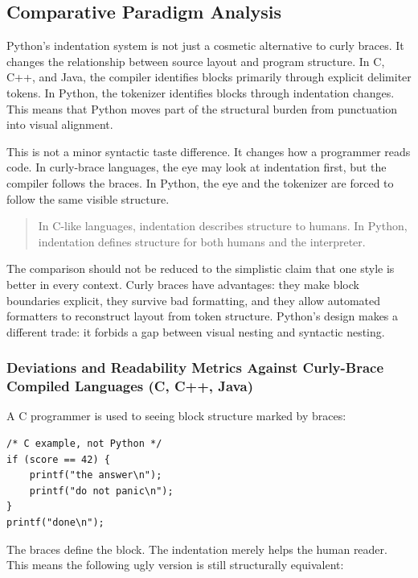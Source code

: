 \subsection{Comparative Paradigm Analysis}

Python's indentation system is not just a cosmetic alternative to curly braces. It changes the relationship between source layout and program structure. In C, C++, and Java, the compiler identifies blocks primarily through explicit delimiter tokens. In Python, the tokenizer identifies blocks through indentation changes. This means that Python moves part of the structural burden from punctuation into visual alignment.

This is not a minor syntactic taste difference. It changes how a programmer reads code. In curly-brace languages, the eye may look at indentation first, but the compiler follows the braces. In Python, the eye and the tokenizer are forced to follow the same visible structure.

\begin{quote}
In C-like languages, indentation describes structure to humans. In Python, indentation defines structure for both humans and the interpreter.
\end{quote}

The comparison should not be reduced to the simplistic claim that one style is better in every context. Curly braces have advantages: they make block boundaries explicit, they survive bad formatting, and they allow automated formatters to reconstruct layout from token structure. Python's design makes a different trade: it forbids a gap between visual nesting and syntactic nesting.

\subsubsection{Deviations and Readability Metrics Against Curly-Brace Compiled Languages (C, C++, Java)}

A C programmer is used to seeing block structure marked by braces:

\begin{verbatim}
/* C example, not Python */
if (score == 42) {
    printf("the answer\n");
    printf("do not panic\n");
}
printf("done\n");
\end{verbatim}

The braces define the block. The indentation merely helps the human reader. This means the following ugly version is still structurally equivalent:

